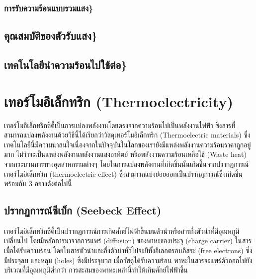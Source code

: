 \documentclass[11pt]{article}
\begin{document}
\subsubsection{การรับความร้อนแบบรวมแสง\}}
\label{sec:org2e64dc3}

\subsection{คุณสมบัติของตัวรับแสง\}}
\label{sec:org2c79b56}

\subsection{เทคโนโลยีนำความร้อนไปใช้ต่อ\}}
\label{sec:orgad0d10a}

\section{เทอร์โมอิเล็กทริก (Thermoelectricity)}
\label{sec:org8718e16}

เทอร์โมอิเล็กทริกซิตี้เป็นการแปลงพลังงานโดยตรงจากความร้อนไปเป็นพลังงานไฟฟ้า ซึ่งสารที่สามารถแปลงพลังงานด้วยวิธีนี้ได้เรียกว่าวัสดุเทอร์โมอิเล็กทริก (Thermoelectric materials) ซึ่งเทคโนโลยีนี้มีความน่าสนใจเนื่องจากในปัจจุบันในโลกของเรายังมีแหล่งพลังงานความร้อนราคาถูกอยู่มาก ไม่ว่าจะเป็นแหล่งพลังงานพลังงานแสงอาทิตย์ หรือพลังงานความร้อนเหลือใช้ (Waste heat) จากกระบวนการทางอุตสาหกรรมต่างๆ โดยในการแปลงพลังงานที่เกิดขึ้นนั้นเกิดขึ้นจากปรากฏการณ์เทอร์โมอิเล็กทริก (thermoelectric effect) ซึ่งสามารถแบ่งย่อยออกเป็นปรากฏการณ์ซึ่งเกิดขึ้นพร้อมกัน 3 อย่างดังต่อไปนี้

\subsection{ปรากฏการณ์ซีเบ็ก (Seebeck Effect)}
\label{sec:org5b25314}

เทอร์โมอิเล็กทริกซิตี้เป็นปรากฏการณ์การเกิดศักย์ไฟฟ้าขึ้นบนตัวนำหรือสารกึ่งตัวนำที่มีอุณหภูมิเปลี่ยนไป โดยมีหลักการมาจากการแพร่ (diffusion) ของพาหะของประจุ (charge carrier) ในสารเมื่อได้รับความร้อน โดยในสารตัวนำและกึ่งตัวนำทั่วไปจะมีทั้งอิเลกตรอนอิสระ (free electrons) ซึ่งมีประจุลบ และหลุม (holes) ซึ่งมีประจุบวก เมื่อวัสดุได้รับความร้อน พาหะในสารจะแพร่ตัวออกไปยังบริเวณที่มีอุณหภูมิต่ำกว่า การสะสมของพาหะเหล่านี้ทำให้เกินศักย์ไฟฟ้าขึ้น
\end{document}
